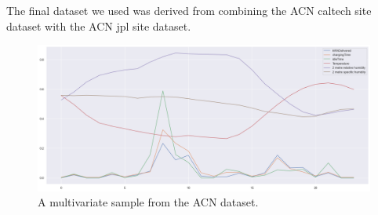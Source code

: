 The final dataset we used was derived from combining the ACN caltech site dataset with the ACN jpl site dataset. 
\begin{figure}[h!]
    \centering
    \includegraphics[width=\textwidth]{images/acn_sample.png}
    \caption{A multivariate sample from the ACN dataset.}
    \label{fig:ACN sample}
\end{figure}